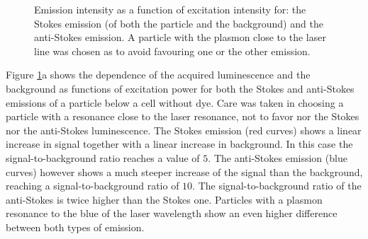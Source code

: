 \documentclass[journal=nalefd,manuscript=letter]{achemso}
\begin{document}
\begin{figure}[htp]
\centering
	\caption{Emission intensity as a function of excitation intensity for: the
	Stokes emission (of both the particle and the background) and the anti-Stokes
	emission. A particle with the plasmon close to the laser line was chosen as to
	avoid favouring one or the other emission.}
	\label{fig:power_intensity}
\end{figure}

Figure \ref{fig:power_intensity}a shows the dependence of the acquired
luminescence and the background as functions of excitation power for both the
Stokes and anti-Stokes emissions of a particle below a cell without dye. Care
was taken in choosing a particle with a resonance close to the laser resonance,
not to favor nor the Stokes nor the anti-Stokes luminescence. The Stokes
emission (red curves) shows a linear increase in signal together with a linear
increase in background. In this case the signal-to-background ratio reaches a
value of $5$. The anti-Stokes emission (blue curves) however shows a much
steeper increase of the signal than the background, reaching a
signal-to-background ratio of $10$. The signal-to-background ratio of the
anti-Stokes is twice higher than the Stokes one. Particles with a plasmon
resonance to the blue of the laser wavelength show an even higher difference
between both types of emission.
\end{document}
